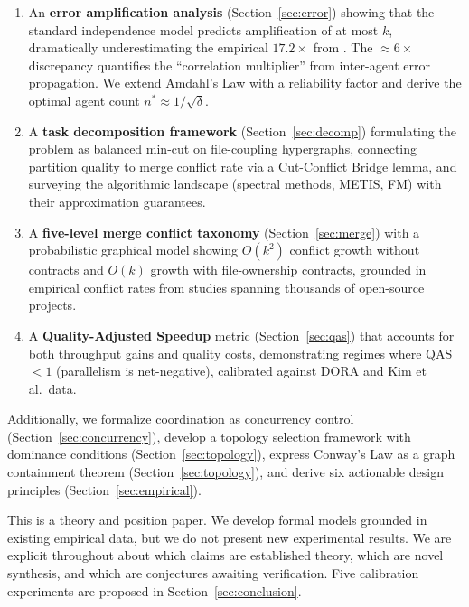 \documentclass[11pt, a4paper, logo, copyright]{googledeepmind}
\begin{document}
\begin{enumerate}[label=(\arabic*)]
  \item An \textbf{error amplification analysis} (Section~\ref{sec:error}) showing that the standard independence model predicts amplification of at most $k$, dramatically underestimating the empirical $17.2\times$ from \citet{Kim2025}. The $\approx 6\times$ discrepancy quantifies the ``correlation multiplier'' from inter-agent error propagation. We extend Amdahl's Law with a reliability factor and derive the optimal agent count $n^* \approx 1/\sqrt{\delta}$.

  \item A \textbf{task decomposition framework} (Section~\ref{sec:decomp}) formulating the problem as balanced min-cut on file-coupling hypergraphs, connecting partition quality to merge conflict rate via a Cut-Conflict Bridge lemma, and surveying the algorithmic landscape (spectral methods, METIS, FM) with their approximation guarantees.

  \item A \textbf{five-level merge conflict taxonomy} (Section~\ref{sec:merge}) with a probabilistic graphical model showing $O(k^2)$ conflict growth without contracts and $O(k)$ growth with file-ownership contracts, grounded in empirical conflict rates from studies spanning thousands of open-source projects.

  \item A \textbf{Quality-Adjusted Speedup} metric (Section~\ref{sec:qas}) that accounts for both throughput gains and quality costs, demonstrating regimes where QAS $< 1$ (parallelism is net-negative), calibrated against DORA and Kim et al.\ data.
\end{enumerate}

Additionally, we formalize coordination as concurrency control (Section~\ref{sec:concurrency}), develop a topology selection framework with dominance conditions (Section~\ref{sec:topology}), express Conway's Law as a graph containment theorem (Section~\ref{sec:topology}), and derive six actionable design principles (Section~\ref{sec:empirical}).

This is a theory and position paper.
We develop formal models grounded in existing empirical data, but we do not present new experimental results.
We are explicit throughout about which claims are established theory, which are novel synthesis, and which are conjectures awaiting verification.
Five calibration experiments are proposed in Section~\ref{sec:conclusion}.
\end{document}
